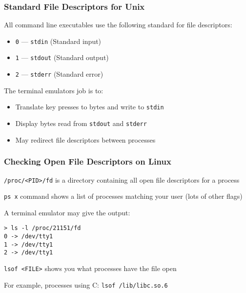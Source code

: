   \begin{frame}
    \frametitle{Standard File Descriptors for Unix}

    All command line executables use the following standard for file
    descriptors:

    \begin{itemize}
      \item \texttt{0} --- \texttt{stdin} (Standard input)
      \item \texttt{1} --- \texttt{stdout} (Standard output)
      \item \texttt{2} --- \texttt{stderr} (Standard error)
    \end{itemize}

    \vspace{2em}

    The terminal emulators job is to:
    \begin{itemize}
      \item Translate key presses to bytes and write to \texttt{stdin}
      \item Display bytes read from \texttt{stdout} and \texttt{stderr}
      \item May redirect file descriptors between processes
    \end{itemize}
  \end{frame}

  \begin{frame}[fragile]
    \frametitle{Checking Open File Descriptors on Linux}

    \texttt{/proc/<PID>/fd} \hspace{0.5em} is a directory containing all open
    file descriptors for a process

    \texttt{ps x} \hspace{0.5em} command shows a list of processes matching your
    user (lots of other flags)

    \vspace{1em}

    A terminal emulator may give the output:
    \begin{lstlisting}[basicstyle=\small\ttfamily]
> ls -l /proc/21151/fd
0 -> /dev/tty1
1 -> /dev/tty1
2 -> /dev/tty1
    \end{lstlisting}

    \vspace{2em}

    \texttt{lsof <FILE>} \hspace{0.5em} shows you what processes have the file
    open

    \hspace{2em} For example, processes using C: \hspace{0.5em}
    \texttt{lsof /lib/libc.so.6}
  \end{frame}

